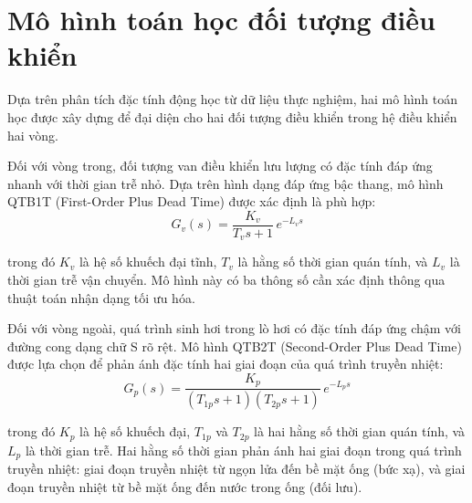 \documentclass[../main.tex]{subfiles}
\begin{document}
\section{Mô hình toán học đối tượng điều khiển}

Dựa trên phân tích đặc tính động học từ dữ liệu thực nghiệm, hai mô hình toán học được xây dựng để đại diện cho hai đối tượng điều khiển trong hệ điều khiển hai vòng.

Đối với vòng trong, đối tượng van điều khiển lưu lượng có đặc tính đáp ứng nhanh với thời gian trễ nhỏ. Dựa trên hình dạng đáp ứng bậc thang, mô hình QTB1T (First-Order Plus Dead Time) được xác định là phù hợp:
\begin{equation}
    G_v(s) = \frac{K_v}{T_v s + 1}\, e^{-L_v s}
    \label{eq:qtb1t}
\end{equation}

trong đó $K_v$ là hệ số khuếch đại tĩnh, $T_v$ là hằng số thời gian quán tính, và $L_v$ là thời gian trễ vận chuyển. Mô hình này có ba thông số cần xác định thông qua thuật toán nhận dạng tối ưu hóa.

Đối với vòng ngoài, quá trình sinh hơi trong lò hơi có đặc tính đáp ứng chậm với đường cong dạng chữ S rõ rệt. Mô hình QTB2T (Second-Order Plus Dead Time) được lựa chọn để phản ánh đặc tính hai giai đoạn của quá trình truyền nhiệt:
\begin{equation}
    G_p(s) = \frac{K_p}{(T_{1p} s + 1)(T_{2p} s + 1)}\, e^{-L_p s}
    \label{eq:qtb2t}
\end{equation}

trong đó $K_p$ là hệ số khuếch đại, $T_{1p}$ và $T_{2p}$ là hai hằng số thời gian quán tính, và $L_p$ là thời gian trễ. Hai hằng số thời gian phản ánh hai giai đoạn trong quá trình truyền nhiệt: giai đoạn truyền nhiệt từ ngọn lửa đến bề mặt ống (bức xạ), và giai đoạn truyền nhiệt từ bề mặt ống đến nước trong ống (đối lưu).
\end{document}
